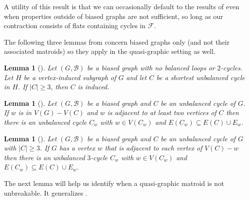 \documentclass[12pt]{article}
\newtheorem{lemma}[theorem]{Lemma}
\theoremstyle{definition}
\theoremstyle{plain} %
\newcommand{\cB}{\mathcal{B}}
\newcommand{\cF}{\mathcal{F}}
\begin{document}
A utility of this result is that we can occasionally default to the results of \cite{Fife-Mayhew-Oxley-Semple2020} even when properties outside of biased graphs are not sufficient, so long as our contraction consists of flats containing cycles in $\cF$. 


The following three lemmas from \cite{Fife-Mayhew-Oxley-Semple2020} concern biased graphs only (and not their associated matroids) so they apply in the quasi-graphic setting as well.

\begin{lemma}[{\cite[Lemma 2.4]{Fife-Mayhew-Oxley-Semple2020}}] \label{lem: induced shortest unbalanced cycles}
Let $(G, \cB)$ be a biased graph with no balanced loops or $2$-cycles. Let $H$ be a vertex-induced subgraph of $G$ and let $C$ be a shortest unbalanced cycle in $H$.
If $|C| \ge 3$, then $C$ is induced.
\end{lemma}

\begin{lemma}[{\cite[Lemma 2.5]{Fife-Mayhew-Oxley-Semple2020}}] \label{lem: wheel}
    Let $(G, \cB)$ be a biased graph and $C$ be an unbalanced cycle of $G$. If $w$ is in $V(G)-V(C)$ and $w$ is adjacent to at least two vertices of $C$ then there is an unbalanced cycle $C_w$ with $w \in V(C_w)$ and $E(C_w) \subseteq E(C) \cup E_w$.
\end{lemma}


\begin{lemma}[{\cite[Lemma 2.6]{Fife-Mayhew-Oxley-Semple2020}}] \label{lem: vertex adjacent to every vertex of cycle}
  Let $(G,\cB)$ be a biased graph and $C$ be an unbalanced cycle of $G$ with $|C| \geq 3$. If $G$ has a vertex $w$ that is adjacent to each vertex of $V(C) - w$ then there is an unbalanced $3$-cycle $C_w$ with $w \in V(C_w)$ and $E(C_w) \subseteq E(C) \cup E_w$.  
\end{lemma}


The next lemma will help us identify when a quasi-graphic matroid is not unbreakable. It generalizes \cite[Lemma 2.7]{Fife-Mayhew-Oxley-Semple2020}.
\end{document}
